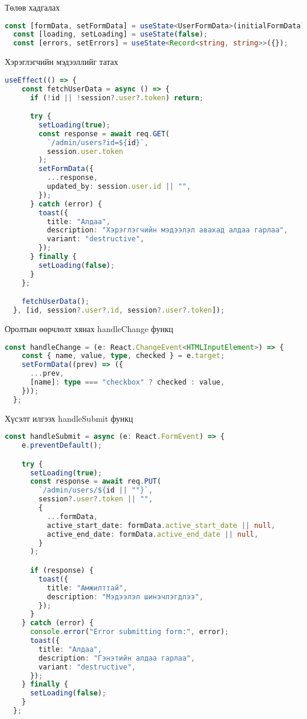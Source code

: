 Төлөв хадгалах
\begin{lstlisting}[language=Typescript, caption=Төлөв хадгалах, frame=single]
	const [formData, setFormData] = useState<UserFormData>(initialFormData);
  const [loading, setLoading] = useState(false);
  const [errors, setErrors] = useState<Record<string, string>>({});
\end{lstlisting}


Хэрэглэгчийн мэдээллийг татах
\begin{lstlisting}[language=Typescript, caption=Хэрэглэгчийн мэдээлэл татах useEffect, frame=single]
	useEffect(() => {
    const fetchUserData = async () => {
      if (!id || !session?.user?.token) return;

      try {
        setLoading(true);
        const response = await req.GET(
          `/admin/users?id=${id}`,
          session.user.token
        );
        setFormData({
          ...response,
          updated_by: session.user.id || "",
        });
      } catch (error) {
        toast({
          title: "Алдаа",
          description: "Хэрэглэгчийн мэдээлэл авахад алдаа гарлаа",
          variant: "destructive",
        });
      } finally {
        setLoading(false);
      }
    };

    fetchUserData();
  }, [id, session?.user?.id, session?.user?.token]);
\end{lstlisting}

Оролтын өөрчлөлт хянах handleChange функц
\begin{lstlisting}[language=Typescript, caption=handleChange, frame=single]
	const handleChange = (e: React.ChangeEvent<HTMLInputElement>) => {
    const { name, value, type, checked } = e.target;
    setFormData((prev) => ({
      ...prev,
      [name]: type === "checkbox" ? checked : value,
    }));
  };
\end{lstlisting}

Хүсэлт илгээх handleSubmit функц
\begin{lstlisting}[language=Typescript, caption=handleSubmit, frame=single]
	const handleSubmit = async (e: React.FormEvent) => {
    e.preventDefault();

    try {
      setLoading(true);
      const response = await req.PUT(
        `/admin/users/${id || ""}`,
        session?.user?.token || "",
        {
          ...formData,
          active_start_date: formData.active_start_date || null,
          active_end_date: formData.active_end_date || null,
        }
      );

      if (response) {
        toast({
          title: "Амжилттай",
          description: "Мэдээлэл шинэчлэгдлээ",
        });
      }
    } catch (error) {
      console.error("Error submitting form:", error);
      toast({
        title: "Алдаа",
        description: "Гэнэтийн алдаа гарлаа",
        variant: "destructive",
      });
    } finally {
      setLoading(false);
    }
  };
\end{lstlisting}

